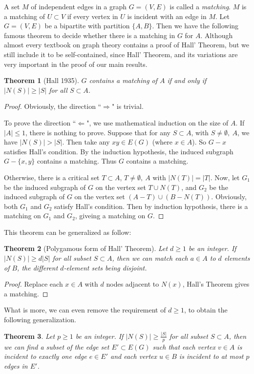 \documentclass[12pt]{report}
\newtheorem{theorem}{Theorem}
\begin{document}
A set $M$ of independent edges in a graph $G=(V,E)$ is called a {\em matching}. 
$M$ is a matching of $U\subset V$ if every vertex in $U$ is incident with an edge in $M$.
Let $G=(V,E)$ be a bipartite with partition $\{A,B\}$. Then we have the following famous theorem to decide whether there is a matching in $G$ for $A$. Although almost every textbook on graph theory contains a proof of Hall' Theorem, but we still include it to be self-contained, since Hall' Theorem, and its variations are very important in the proof of our main results.
\begin{theorem}[Hall 1935]\label{hallori1th}
$G$ contains a matching of $A$ if and only if $|N(S)|\ge|S|$ for all $S\subset A$.
\end{theorem}
\begin{proof}
Obviously, the direction ``$\Rightarrow$" is trivial.

To prove the direction ``$\Leftarrow$", we use mathematical induction on the size of $A$.
If $|A|\le1$, there is nothing to prove.
Suppose that for any $S\subset A$, with $S\neq\emptyset,~A$, we have $|N(S)|>|S|$. Then take any $xy\in E(G)$ (where $x\in A$). So $G-x$ satisfies Hall's condition. By the induction hypothesis, the induced subgraph $G-\{x,y\}$ contains a matching. Thus $G$ contains a matching.

Otherwise, there is a critical set $T\subset A$, $T\neq\emptyset,~A$ with $|N(T)|=|T|$. Now, let $G_1$ be the induced subgraph of $G$ on the vertex set $T\cup N(T)$, and $G_2$ be the induced subgraph of $G$ on the vertex set $(A-T)\cup(B-N(T))$. Obviously, both $G_1$ and $G_2$ satisfy Hall's condition. Then by induction hypothesis, there is a matching on $G_1$ and $G_2$, giveing a matching on $G$.


\end{proof}


This theorem can be generalized as follow:
\begin{theorem}[Polygamous form of Hall' Theorem]
Let $d\ge1$ be an integer. If $|N(S)|\ge d|S|$ for all subset $S\subset A$, then we can match each $a\in A$ to $d$ elements of $B$, the different $d$-element sets being disjoint.
\end{theorem}
\begin{proof}

Replace each $x\in A$ with $d$ nodes adjacent to $N(x)$, Hall's Theorem gives a matching.

\end{proof}


What is more, we can even remove the requirement of $d\ge1$, to obtain the following generalization.
\begin{theorem}\label{zuiqianghallt}
Let $p\ge1$ be an integer. If $|N(S)|\ge\frac{|S|}{p}$ for all subset $S\subset A$, then we can find a subset of the edge set $E'\subset E(G)$ such that each vertex $v\in A$ is incident to exactly one edge $e\in E'$ and each vertex $u\in B$ is incident to at most $p$ edges in $E'$.
\end{theorem}
\end{document}
